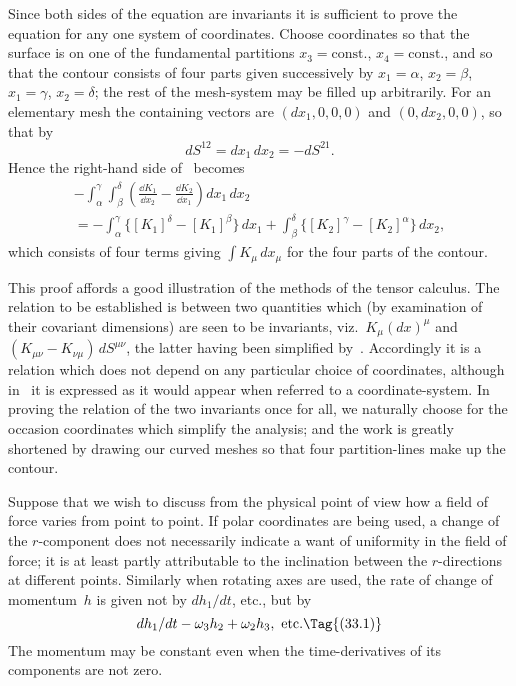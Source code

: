 \documentclass[12pt]{book}
\begin{document}
Since both sides of the equation are invariants it is sufficient to prove the
equation for any one system of coordinates. Choose coordinates so that the
surface is on one of the fundamental partitions $x_3 = \text{const.}$, $x_4 = \text{const.}$, and so
that the contour consists of four parts given successively by $x_1 = \alpha$, $x_2 = \beta$,
$x_1 = \gamma$, $x_2 = \delta$; the rest of the mesh\hyp{}system may be filled up arbitrarily. For
an elementary mesh the containing vectors are $(dx_1, 0, 0, 0)$ and $(0, dx_2 , 0, 0)$,
so that by~
\[
dS^{12} = dx_{1}\, dx_{2} = -dS^{21}.
\]
Hence the right-hand side of~ becomes
\begin{multline*}
  -\int_{\alpha}^{\gamma} \int_{\beta}^{\delta} \left(\frac{\dd K_{1}}{\dd x_{2}} - \frac{\dd K_{2}}{\dd x_{1}}\right) dx_{1}\, dx_{2} \\
  = -\int_{\alpha}^{\gamma} \bigl\{[K_{1}]^{\delta} - [K_{1}]^{\beta}\bigr\}\, dx_{1}
   + \int_{\beta}^{\delta} \bigl\{[K_{2}]^{\gamma} - [K_{2}]^{\alpha}\bigr\}\, dx_{2},
\end{multline*}
which consists of four terms giving $\int K_{\mu}\, dx_{\mu}$ for the four parts of the contour.

This proof affords a good illustration of the methods of the tensor calculus.
The relation to be established is between two quantities which (by examination
of their covariant dimensions) are seen to be invariants, viz.\ $K_{\mu} (dx)^{\mu}$ and
%
%
$(K_{\mu\nu} - K_{\nu\mu})\, dS^{\mu\nu}$, the latter having been simplified by~. Accordingly it
is a relation which does not depend on any particular choice of coordinates,
although in~ it is expressed as it would appear when referred to a
coordinate\hyp{}system. In proving the relation of the two invariants once for all,
we naturally choose for the occasion coordinates which simplify the analysis;
and the work is greatly shortened by drawing our curved meshes so that four
partition\hyp{}lines make up the contour.


Suppose that we wish to discuss from the physical point of view how a
field of force varies from point to point. If polar coordinates are being used,
a change of the $r$-component does not necessarily indicate a want of uniformity
in the field of force; it is at least partly attributable to the inclination between
the $r$-directions at different points. Similarly when rotating axes are used,
the rate of change of momentum~$h$ is given not by $dh_1/dt$, etc., but by
\[
dh_1/dt - \omega_3 h_2 + \omega_2 h_3, \text{ etc.}
\Tag{(33.1)}
\]
The momentum may be constant even when the time\hyp{}derivatives of its components
are not zero.
\end{document}
